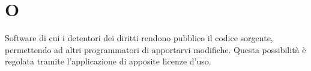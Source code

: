 
\section{O}
Software di cui i detentori dei diritti rendono pubblico il codice sorgente, permettendo ad altri programmatori di apportarvi modifiche. Questa possibilità è regolata tramite l’applicazione di apposite licenze d’uso.
